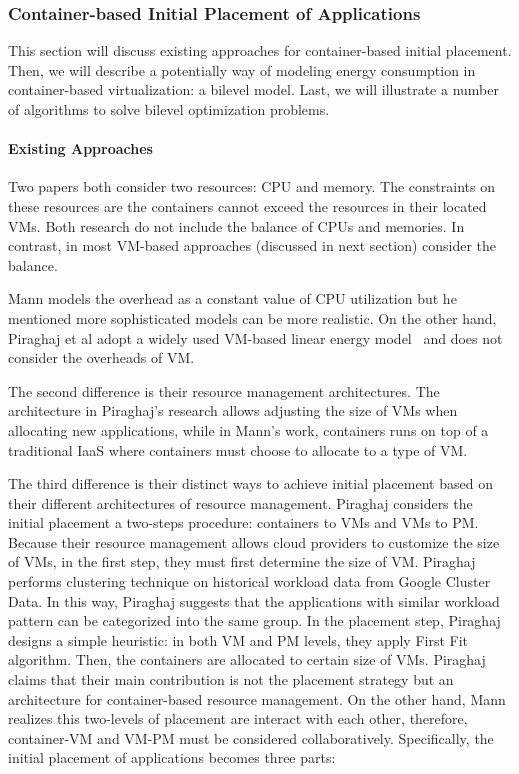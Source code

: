 \subsubsection{Container-based Initial Placement of Applications}
\label{container-based-placement}
This section will discuss existing approaches for container-based initial placement. Then, we will describe a potentially way of modeling energy consumption in container-based virtualization: a bilevel model. Last, we will illustrate a number of algorithms to solve bilevel optimization problems. 


\paragraph{Existing Approaches}

 Two papers both consider two resources: CPU and memory. The constraints on these resources are the containers cannot exceed the resources in their located VMs. Both research do not include the balance of CPUs and memories. In contrast, in most VM-based approaches (discussed in next section) consider the balance.

 Mann models the overhead as a constant value of CPU utilization but he mentioned more sophisticated models can be more realistic. On the other hand, Piraghaj et al \cite{Piraghaj:2016bw} adopt a widely used VM-based linear energy model~\cite{Xavier:2017jl} and does not consider the overheads of VM. 

The second difference is their resource management architectures. The architecture in Piraghaj's research allows adjusting 
the size of VMs when allocating new applications, while in Mann's work, containers runs on top of a traditional IaaS where containers must choose to allocate to a type of VM. 

The third difference is their distinct ways to achieve initial placement based on their different architectures of resource management. Piraghaj considers the initial placement a two-steps procedure: containers to VMs and VMs to PM. Because their resource management allows cloud providers to customize the size of VMs, in the first step, they must first determine the size of VM. Piraghaj performs clustering technique on historical workload data from Google Cluster Data. In this way, Piraghaj suggests that the applications with similar workload pattern can be categorized into the same group. In the placement step, Piraghaj designs a simple heuristic: in both VM and PM levels, they apply First Fit algorithm. Then, the containers are allocated to certain size of VMs. Piraghaj claims that their main contribution is not the placement strategy but an architecture for container-based resource management. On the other hand, Mann realizes this two-levels of placement are interact with each other, therefore, container-VM and VM-PM must be considered collaboratively. Specifically, the initial placement of applications becomes three parts: 

